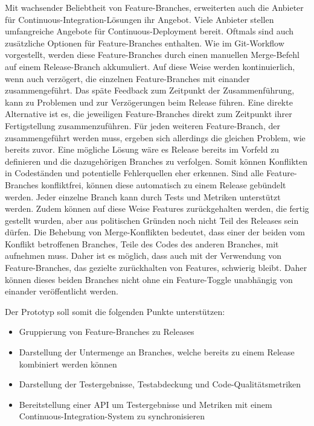 Mit wachsender Beliebtheit von Feature-Branches, erweiterten auch die Anbieter für Continuous-Integration-Lösungen ihr Angebot. Viele Anbieter stellen umfangreiche Angebote für Continuous-Deployment bereit. Oftmals sind auch zusätzliche Optionen für Feature-Branches enthalten. Wie im Git-Workflow vorgestellt, werden diese Feature-Branches durch einen manuellen Merge-Befehl auf einem Release-Branch akkumuliert. Auf diese Weise werden kontinuierlich, wenn auch verzögert, die einzelnen Feature-Branches mit einander zusammengeführt. Das späte Feedback zum Zeitpunkt der Zusammenführung, kann zu Problemen und zur Verzögerungen beim Release führen. Eine direkte Alternative ist es, die jeweiligen Feature-Branches direkt zum Zeitpunkt ihrer Fertigstellung zusammenzuführen. Für jeden weiteren Feature-Branch, der zusammengeführt werden muss, ergeben sich allerdings die gleichen Problem, wie bereits zuvor.
Eine mögliche Lösung wäre es Release bereits im Vorfeld zu definieren und die dazugehörigen Branches zu verfolgen. Somit können Konflikten in Codeständen und potentielle Fehlerquellen eher erkennen. Sind alle Feature-Branches konfliktfrei, können diese automatisch zu einem Release gebündelt werden. Jeder einzelne Branch kann durch Tests und Metriken unterstützt werden. Zudem können auf diese Weise Features zurückgehalten werden, die fertig gestellt wurden, aber aus politischen Gründen noch nicht Teil des Releases sein dürfen. 
Die Behebung von Merge-Konflikten bedeutet, dass einer der beiden vom Konflikt betroffenen Branches, Teile des Codes des anderen Branches, mit aufnehmen muss. Daher ist es möglich, dass auch mit der Verwendung von Feature-Branches, das gezielte zurückhalten von Features, schwierig bleibt. Daher können dieses beiden Branches nicht ohne ein Feature-Toggle unabhängig von einander veröffentlicht werden.

Der Prototyp soll somit die folgenden Punkte unterstützen:
\begin{itemize}
\item Gruppierung von Feature-Branches zu Releases
\item Darstellung der Untermenge an Branches, welche bereits zu einem Release kombiniert werden können
\item Darstellung der Testergebnisse, Testabdeckung und Code-Qualitätsmetriken
\item Bereitstellung einer API um Testergebnisse und Metriken mit einem Continuous-Integration-System zu synchronisieren
\end{itemize}

